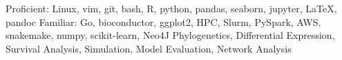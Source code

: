 \begin{cvskills}
\vspace{-0.05in}
    	    {Proficient:  Linux, vim, git, bash, R, python, pandas, seaborn, jupyter, LaTeX, pandoc}
	\cvskill{}
            {Familiar: Go, bioconductor, ggplot2, HPC, Slurm, PySpark, AWS, snakemake, numpy, scikit-learn, Neo4J}
            {Phylogenetics, Differential Expression, Survival Analysis, Simulation, Model Evaluation, Network Analysis}
\end{cvskills}
